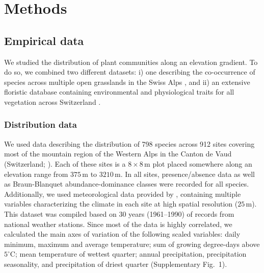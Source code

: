 \documentclass[11pt, a4paper]{article}
\begin{document}


 
\section*{Methods}
\subsection*{Empirical data}
We studied the distribution of plant communities along an elevation gradient. To do so, we combined two different datasets: i) one describing the co-occurrence of species across multiple open grasslands in the Swiss Alps \citep{randinClimateChangePlant2009}, and ii) an extensive floristic database containing environmental and physiological traits for all vegetation across Switzerland \citep{landoltFloraIndicativaOkologische2010}. 

\subsubsection*{Distribution data}
We used data describing the distribution of 798 species across 912 sites covering most of the mountain region of the Western Alps in the Canton de Vaud (Switzerland; \citealt{scherrerEcologicalIndicatorValues2019}). Each of these sites is a $8\times 8\,\text{m}$ plot placed somewhere along an elevation range from $375\,\text{m}$ to $3210\,\text{m}$. In all sites, presence/absence data as well as Braun-Blanquet abundance-dominance classes were recorded for all species. Additionally, we used meteorological data provided by \citet{scherrerEcologicalIndicatorValues2019}, containing multiple variables characterizing the climate in each site at high spatial resolution ($25\,\text{m}$). This dataset was compiled based on 30 years (1961–1990) of records from national weather stations. Since most of the data is highly correlated, we calculated the main axes of variation of the following scaled variables: daily minimum, maximum and average temperature; sum of growing degree-days above $5^{\circ}\text{C}$; mean temperature of wettest quarter; annual precipitation, precipitation seasonality, and precipitation of driest quarter (Supplementary Fig.~1).  %
\end{document}
